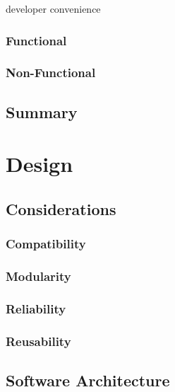 \documentclass{l4proj}
\begin{document}
developer convenience

\subsection{Functional}

\subsection{Non-Functional}

\section*{Summary}




\chapter{Design}

\section{Considerations}

\subsection{Compatibility}

\subsection{Modularity}

\subsection{Reliability}

\subsection{Reusability}

\section{Software Architecture}
\end{document}
